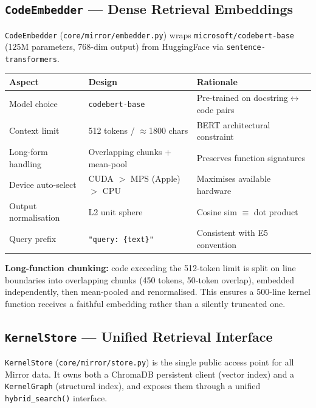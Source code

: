 \documentclass[11pt,a4paper]{article}
\newcommand{\coderef}[1]{\texttt{\small\color{layer2}#1}}
\begin{document}
\subsection{\texttt{CodeEmbedder} --- Dense Retrieval Embeddings}
\label{sec:embedder}

\coderef{CodeEmbedder} (\texttt{core/mirror/embedder.py}) wraps
\texttt{microsoft/codebert-base} (125M parameters, 768-dim output) from
HuggingFace via \texttt{sentence-transformers}.

\begin{center}
\renewcommand{\arraystretch}{1.3}
\begin{tabular}{@{}lll@{}}
\toprule
\textbf{Aspect} & \textbf{Design} & \textbf{Rationale} \\
\midrule
Model choice & \texttt{codebert-base} & Pre-trained on docstring$\leftrightarrow$code pairs \\
Context limit & 512 tokens / $\approx$1800 chars & BERT architectural constraint \\
Long-form handling & Overlapping chunks + mean-pool & Preserves function signatures \\
Device auto-select & CUDA $>$ MPS (Apple) $>$ CPU & Maximises available hardware \\
Output normalisation & L2 unit sphere & Cosine sim $\equiv$ dot product \\
Query prefix & \texttt{"query: \{text\}"} & Consistent with E5 convention \\
\bottomrule
\end{tabular}
\end{center}

\noindent
\textbf{Long-function chunking:} code exceeding the 512-token limit is split
on line boundaries into overlapping chunks (450 tokens, 50-token overlap),
embedded independently, then mean-pooled and renormalised. This ensures a
500-line kernel function receives a faithful embedding rather than a silently
truncated one.

\subsection{\texttt{KernelStore} --- Unified Retrieval Interface}
\label{sec:store}

\coderef{KernelStore} (\texttt{core/mirror/store.py}) is the single public
access point for all Mirror data. It owns both a ChromaDB persistent client
(vector index) and a \coderef{KernelGraph} (structural index), and exposes
them through a unified \texttt{hybrid\_search()} interface.
\end{document}
